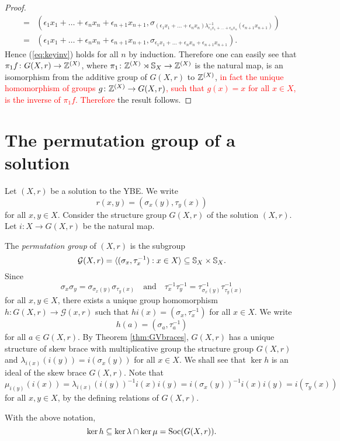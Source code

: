 \begin{proof}
\begin{align*}
    =&(\epsilon_1x_1+\dots +\epsilon_nx_n+\epsilon_{n+1}x_{n+1},\sigma_{(\epsilon_1x_1+\dots +\epsilon_nx_n)\lambda^{-1}_{\epsilon_1x_1+\dots +\epsilon_nx_n}(\epsilon_{n+1}x_{n+1})})\\
    =&(\epsilon_1x_1+\dots +\epsilon_nx_n+\epsilon_{n+1}x_{n+1},\sigma_{\epsilon_1x_1+\dots +\epsilon_nx_n+\epsilon_{n+1}x_{n+1}}).
\end{align*}
Hence (\ref{eq:keyinv}) holds for all $n$ by induction. Therefore
 one can easily see that $\pi_1f\colon G(X,r)\to\mathbb{Z}^{(X)}$, where $\pi_1\colon \mathbb{Z}^{(X)}\rtimes\mathbb{S}_X\to\mathbb{Z}^{(X)}$ is the natural map, is an isomorphism from the additive group of $G(X,r)$ to $\mathbb{Z}^{(X)}$, \textcolor{red}{in fact the unique homomorphism of groups $g\colon \mathbb{Z}^{(X)}\to G(X,r)$, such that $g(x)=x$ for all $x\in X$, is the inverse of $\pi_1 f$. Therefore } the result follows. 
\end{proof}

\section{The permutation group of a solution}

Let $(X,r)$ be a solution to the YBE. We write 
\[r(x,y)=(\sigma_x(y),\tau_y(x))\] 
for all $x,y\in X$. Consider the structure group $G(X,r)$ of the solution $(X,r)$. Let $i\colon X\to G(X,r)$ be the natural map. 

The {\em permutation group} of $(X,r)$ is the subgroup
\[\mathcal{G}(X,r)=\langle (\sigma_x,\tau^{-1}_x) : x\in X\rangle\subseteq\mathbb{S}_X\times\mathbb{S}_X.\]
Since 
\[ \sigma_x\sigma_y=\sigma_{\sigma_x(y)}\sigma_{\tau_y(x)}\quad\text{and}\quad \tau^{-1}_x\tau^{-1}_y=\tau^{-1}_{\sigma_x(y)}\tau^{-1}_{\tau_y(x)} \]
for all $x,y\in X$, there exists a unique group homomorphism
$h\colon G(X,r)\to \mathcal{G}(x,r)$ such that $hi(x)=(\sigma_x,\tau^{-1}_x)$ for all $x\in X$. We write
\[ h(a)=(\sigma_a,\tau_a^{-1})\]
for all $a\in G(X,r)$.
By Theorem \ref{thm:GVbraces}, $G(X,r)$ has a unique structure of skew brace with multiplicative group the structure group $G(X,r)$ and $\lambda_{i(x)}(i(y))=i(\sigma_x(y))$ for all $x\in X$. We shall see that $\ker h$ is an ideal of the skew brace $G(X,r)$. Note that
\[\mu_{i(y)}(i(x))=\lambda_{i(x)}(i(y))^{-1}i(x)i(y)=i(\sigma_x(y))^{-1}i(x)i(y)=i(\tau_y(x))\]
for all $x,y\in X$, by the defining relations of $G(X,r)$.

\begin{lemma}\label{lem:Kerh}
With the above notation,
\[ \ker h\subseteq \ker\lambda\cap\ker\mu=\operatorname{Soc}(G(X,r)).\]
\end{lemma}

